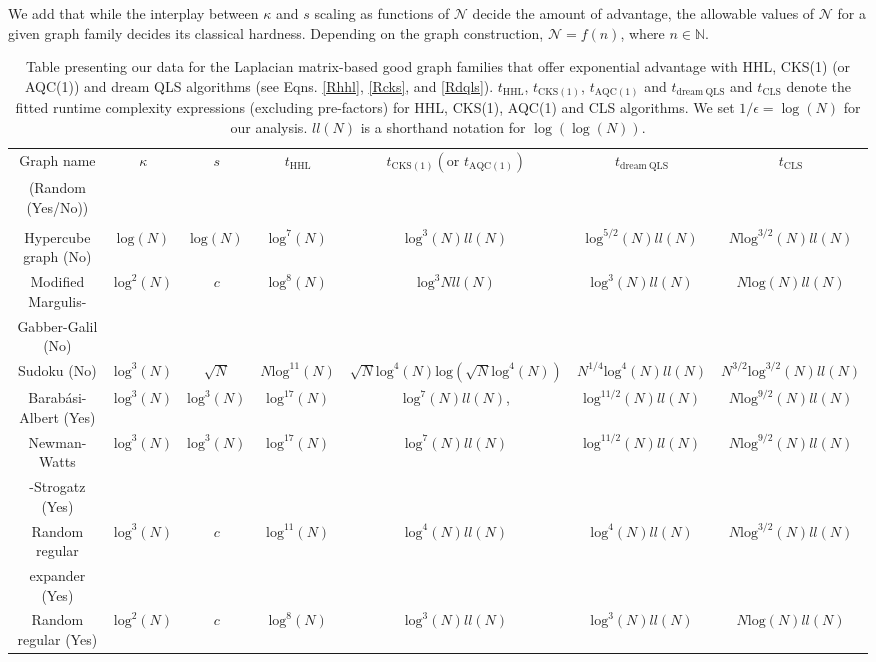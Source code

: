 \documentclass[%
 reprint,
 superscriptaddress,
 amsmath,amssymb,
 aps,
 pra,
floatfix,
nofootinbib,
]{revtex4-2}
\theoremstyle{definition}
\theoremstyle{remark}
\begin{document}
We add that while the interplay between $\kappa$ and $s$ scaling as functions of $\mathcal{N}$ decide the amount of advantage, the allowable values of $\mathcal{N}$ for a given graph family decides its classical hardness. Depending on the graph construction, $\mathcal{N}=f(n)$, where $n \in \mathbb{N}$. 

\newcommand{\col}[7]{#1 &#2 &#3 &#4 &#6  &#7 &#5 \\ } 
\begin{table}[t] 
\caption{Table presenting our data for the Laplacian matrix-based good graph families that offer exponential advantage with HHL, CKS(1) (or AQC(1)) and dream QLS algorithms (see Eqns. \ref{Rhhl}, \ref{Rcks}, and \ref{Rdqls}). $t_{\mathrm{HHL}}$, $t_{\mathrm{CKS(1)}}$, $t_{\mathrm{AQC(1)}}$ and $t_{\mathrm{dream \ QLS}}$ and $t_{\mathrm{CLS}}$ denote the fitted runtime complexity expressions (excluding pre-factors) for HHL, CKS(1), AQC(1) and CLS algorithms. We set $1/\epsilon = \log{(N)}$ for our analysis. $ll(N)$ is a shorthand notation for $\log(\log(N))$. } 
\label{tab:yaya} 
\centering 
\hspace*{-1.3cm}
\begin{tabular}{|c|c|c|c|c|c|c|} 
\hline 
\col{Graph name}{$\kappa$}{$s$}{$t_{\mathrm{HHL}}$}{$t_{\mathrm{CLS}}$}{$t_{\mathrm{CKS(1)}}(\text{or }t_{\mathrm{AQC(1)}}) $}{$t_{\mathrm{dream\ QLS}}$}
\col{(Random (Yes/No))}{}{}{}{}{}{}
\col{}{}{}{}{}{}{}

\hline \hline 

\col{Hypercube graph (No)}{$\mathrm{log}(N)$}{$\mathrm{log}(N)$}{$\mathrm{log}^7(N)$}{$N \mathrm{log}^{3/2}(N) ll(N)$}{$\mathrm{log}^3(N)ll(N)$}{$\mathrm{log}^{5/2}(N)ll(N)$}
\hline 

\col{Modified Margulis-}{$\mathrm{log}^2(N)$}{$c$} {$\mathrm{log}^{8}(N)$}{$N \mathrm{log}(N)ll(N)$}{$\mathrm{log}^3Nll(N)$}{$\mathrm{log}^{3}(N)ll(N)$}
\col{Gabber-Galil (No)}{}{}{}{}{}{}
\hline 

\col{Sudoku (No)}{$\mathrm{log}^3(N)$}{$\sqrt{N}$} {$N\mathrm{log}^{11}(N)$}{$N^{3/2}\mathrm{log}^{3/2}(N) ll(N)$}{$\sqrt{N}\mathrm{log}^4(N)\mathrm{log}(\sqrt{N}\mathrm{log}^4(N))$}{$N^{1/4}\mathrm{log}^{4}(N)ll(N)$}
\hline 

\col{Barabási-Albert (Yes)}{$\mathrm{log}^3(N)$}{$\mathrm{log}^3(N)$} {$\mathrm{log}^{17}(N)$}{$N \mathrm{log}^{9/2}(N)ll(N)$}{$\mathrm{log}^7(N)ll(N)$,}{$\mathrm{log}^{11/2}(N)ll(N)$}
\hline 

\col{Newman-Watts}{$\mathrm{log}^3(N)$}{$\mathrm{log}^3(N)$} {$\mathrm{log}^{17}(N)$}{$N \mathrm{log}^{9/2}(N)ll(N)$}{$\mathrm{log}^7(N)ll(N)$}{$\mathrm{log}^{11/2}(N)ll(N)$}
\col{-Strogatz (Yes)}{}{}{}{}{}{}
\hline 

\col{Random regular}{$\mathrm{log}^3(N)$}{$c$} {$\mathrm{log}^{11}(N)$}{$N \mathrm{log}^{3/2}(N)ll(N)$}{$\mathrm{log}^4(N)ll(N)$}{$\mathrm{log}^{4}(N)ll(N)$}
\col{expander (Yes)}{}{}{}{}{}{}
\hline 

\col{Random regular (Yes)}{$\mathrm{log}^2(N)$}{$c$} {$\mathrm{log}^{8}(N)$}{$N \mathrm{log}(N)ll(N)$}{$\mathrm{log}^3(N)ll(N)$}{$\mathrm{log}^{3}(N)ll(N)$}
\hline 


\hline \hline 
\end{tabular} 
\end{table} 
\end{document}
